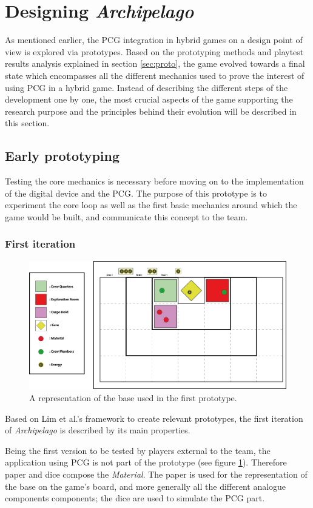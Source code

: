 \section{Designing \textit{Archipelago}}
As mentioned earlier, the PCG integration in hybrid games on a design point of view is explored via prototypes. Based on the prototyping methods and playtest results analysis explained in section \ref{sec:proto}, the game evolved towards a final state which encompasses all the different mechanics used to prove the interest of using PCG in a hybrid game. Instead of describing the different steps of the development one by one, the most crucial aspects of the game supporting the research purpose and the principles behind their evolution will be described in this section.  
\subsection{Early prototyping}
Testing the core mechanics is necessary before moving on to the implementation of the digital device and the PCG. The purpose of this prototype is to experiment the core loop as well as the first basic mechanics around which the game would be built, and communicate this concept to the team.
\subsubsection{First iteration}
\begin{figure}[!ht]
    \centering
    \includegraphics[scale=0.5]{Images/Board1.png}
    \caption{A representation of the base used in the first prototype.}
    \label{fig:base1}
\end{figure}
Based on Lim et al.'s framework to create relevant prototypes, the first iteration of \textit{Archipelago} is described by its main properties.

Being the first version to be tested by players external to the team, the application using PCG is not part of the prototype (see figure \ref{fig:base1}). Therefore paper and dice compose the \textit{Material}. The paper is used for the representation of the base on the game's board, and more generally all the different analogue components components; the dice are used to simulate the PCG part. 

